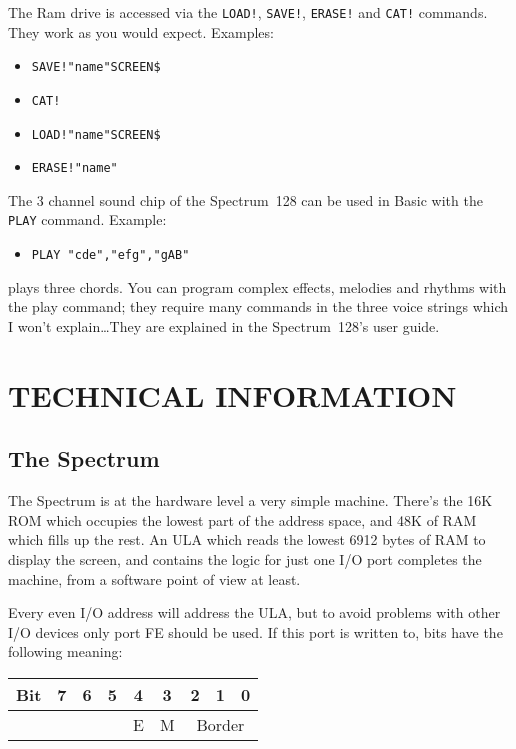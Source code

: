     The Ram drive is accessed via the \verb|LOAD!|, \verb|SAVE!|,
    \verb|ERASE!| and \verb|CAT!|
    commands.  They work as you would expect.  Examples:
\begin{itemize}
  \item[] \verb|SAVE!"name"SCREEN$|
  \item[] \verb|CAT!|
  \item[] \verb|LOAD!"name"SCREEN$|
  \item[] \verb|ERASE!"name"|
\end{itemize}
    The 3 channel sound chip of the Spectrum~128 can be used in Basic with
    the \verb|PLAY| command.  Example:
\begin{itemize}
  \item[] \verb|PLAY "cde","efg","gAB"|
\end{itemize}
    plays three chords.  You can program complex effects, melodies and
    rhythms with the play command; they require many commands in the three
    voice strings which I won't explain\ldots  They are explained in the
    Spectrum~128's user guide.

\newpage



\section{TECHNICAL INFORMATION}


\subsection{The Spectrum}

    The Spectrum is at the hardware level a very simple machine.  There's
    the 16K ROM which occupies the lowest part of the address space, and 48K
    of RAM which fills up the rest.  An ULA which reads the lowest 6912
    bytes of RAM to display the screen, and contains the logic for just one
    I/O port completes the machine, from a software point of view at least.

    Every even I/O address will address the ULA, but to avoid problems with
    other I/O devices only port FE should be used.  If this port is written
    to, bits have the following meaning:\\

\begin{tabular}{|r||c|c|c|c|c|c|c|c|}
  \hline
    Bit &  7  &  6  &  5  &  4  &  3  &  2  &  1  &  0\\
  \hline
  \hline
        &     &     &     &  E  &  M  & \multicolumn{3}{c|}{Border}\\
  \hline
\end{tabular}\\

